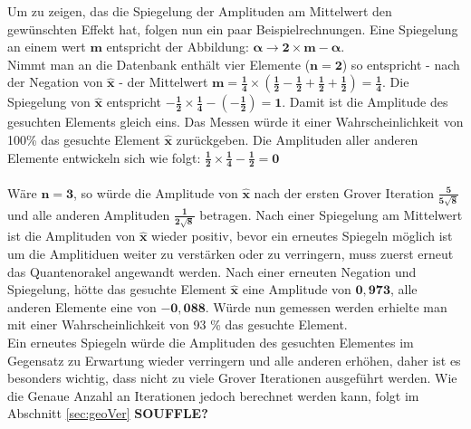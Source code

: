 \noindent
Um zu zeigen, das die Spiegelung der Amplituden am Mittelwert den gewünschten Effekt hat, folgen nun ein paar Beispielrechnungen. Eine Spiegelung an einem wert $\mathbf{m}$ entspricht der Abbildung: $\mathbf{\alpha \rightarrow 2 \times m - \alpha}$. \\
Nimmt man an die Datenbank enthält vier Elemente ($\mathbf{n=2}$) so entspricht - nach der Negation von $\mathbf{\hat x}$ - der Mittelwert $\mathbf{m = \frac{1}{4} \times (\frac{1}{2}- \frac{1}{2}+ \frac{1}{2} +\frac{1}{2}) = \frac{1}{4}}$. Die Spiegelung von $\mathbf{\hat x}$ entspricht $\mathbf{-\frac{1}{2} \times \frac{1}{4} - (-\frac{1}{2}) = 1}$. Damit ist die Amplitude des gesuchten Elements gleich eins. Das Messen würde it einer Wahrscheinlichkeit von 100\%  das gesuchte Element $\mathbf{\hat x}$ zurückgeben. Die Amplituden aller anderen Elemente entwickeln sich wie folgt: $\mathbf{\frac{1}{2} \times \frac{1}{4} - \frac{1}{2} = 0}$
\\ \\
Wäre $\mathbf{n = 3}$, so würde die Amplitude von $\mathbf{ \hat x}$ nach der ersten Grover Iteration $\mathbf{\frac{5}{5\sqrt 8}}$ und alle anderen Amplituden $\mathbf{\frac{1}{2\sqrt 8}}$ betragen. Nach einer Spiegelung am Mittelwert ist die Amplituden von $\mathbf{\hat x}$ wieder positiv, bevor ein erneutes Spiegeln möglich ist um die Amplitiduen weiter zu verstärken oder zu verringern, muss zuerst erneut das Quantenorakel angewandt werden. Nach einer erneuten Negation und Spiegelung, hötte das gesuchte Element $\mathbf{\hat x}$  eine Amplitude von $\mathbf{0,973}$, alle anderen Elemente eine von $\mathbf{-0, 088}$. Würde nun gemessen werden erhielte man mit einer Wahrscheinlichkeit von 93 \% das gesuchte Element.
\\ 
Ein erneutes Spiegeln würde die Amplituden des gesuchten Elementes  im Gegensatz zu Erwartung wieder verringern und alle anderen erhöhen, daher ist es besonders wichtig, dass nicht zu viele Grover Iterationen ausgeführt werden. Wie die Genaue Anzahl an Iterationen jedoch berechnet werden kann, folgt im Abschnitt \ref{sec:geoVer}
\textbf{SOUFFLE?}
